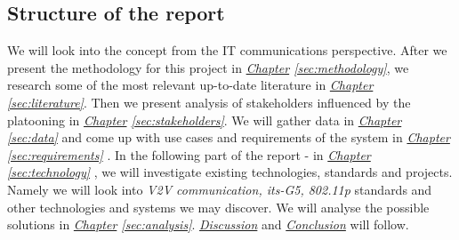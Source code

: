 \subsection{Structure of the report}
We will look into the concept from the IT communications perspective. After we present the methodology for this project in 
\textit{\hyperref[sec:methodology]{Chapter} \ref{sec:methodology}},
we research some of the most relevant up-to-date literature in 
\textit{\hyperref[sec:literature]{Chapter} \ref{sec:literature}}. 
Then we present analysis of stakeholders influenced by the platooning in 
\textit{\hyperref[sec:stakeholders]{Chapter} \ref{sec:stakeholders}}.
We will gather data in
\textit{\hyperref[sec:data]{Chapter} \ref{sec:data}}
and come up with use cases and requirements of the system in 
\textit{\hyperref[sec:requirements]{Chapter} \ref{sec:requirements}}
. In the following part of the report - in 
\textit{\hyperref[sec:technology]{Chapter} \ref{sec:technology}}
, we will investigate existing technologies, standards and projects. Namely we will look into \emph{\acrshort{V2V} communication, \acrshort{its}-G5, 802.11p} standards and other technologies and systems we may discover. We will analyse the possible solutions in 
\textit{\hyperref[sec:analysis]{Chapter} \ref{sec:analysis}}.
\hyperref[sec:discussion]{\textit{Discussion}} and \hyperref[sec:conclusion]{\textit{Conclusion}} will follow.
% 
% 

